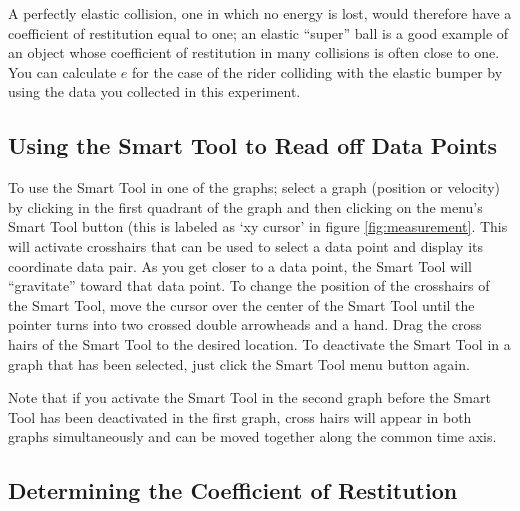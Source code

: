 A perfectly elastic collision, one in which no energy is lost, would therefore have a coefficient of restitution equal to one; an elastic ``super'' ball is a good example of an object whose coefficient of restitution in many collisions is often close to one.  You can calculate $e$ for the case of the rider colliding with the elastic bumper by using the data you collected in this experiment.  

\subsection{Using the Smart Tool to Read off Data Points}

To use the Smart Tool in one of the graphs; select a graph (position or velocity) by clicking in the first quadrant of the graph and then clicking on the menu's Smart Tool button (this is labeled as `xy cursor' in figure \ref{fig:measurement}.  This will activate crosshairs that can be used to select a data point and display its coordinate data pair.  As you get closer to a data point, the Smart Tool will ``gravitate'' toward that data point.  To change the position of the crosshairs of the Smart Tool, move the cursor over the center of the Smart Tool until the pointer turns into two crossed double arrowheads and a hand.  Drag the cross hairs of the Smart Tool to the desired location.  To deactivate the Smart Tool in a graph that has been selected, just click the Smart Tool menu button again.  \myskip

Note that if you activate the Smart Tool in the second graph before the Smart Tool has been deactivated in the first graph, cross hairs will appear in both graphs simultaneously and can be moved together along the common time axis.

\subsection{Determining the Coefficient of Restitution}

